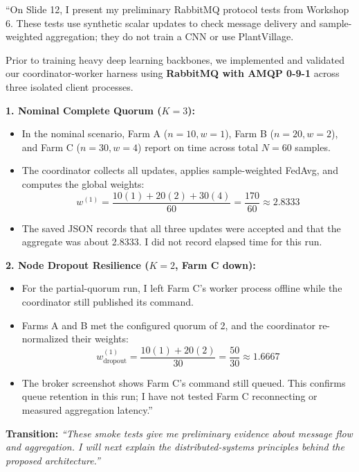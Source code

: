 \documentclass[11pt,a4paper]{article}
\begin{document}
\begin{tcolorbox}[colframe=darkgreen, title=\textbf{What to Say in the Presentation (Literal Script)}]
``On Slide 12, I present my preliminary RabbitMQ protocol tests from Workshop 6. These tests use synthetic scalar updates to check message delivery and sample-weighted aggregation; they do not train a CNN or use PlantVillage.

Prior to training heavy deep learning backbones, we implemented and validated our coordinator-worker harness using \textbf{RabbitMQ with AMQP 0-9-1} across three isolated client processes.

\textbf{1. Nominal Complete Quorum ($K=3$):}
\begin{itemize}
    \item In the nominal scenario, Farm A ($n=10, w=1$), Farm B ($n=20, w=2$), and Farm C ($n=30, w=4$) report on time across total $N=60$ samples.
    \item The coordinator collects all updates, applies sample-weighted FedAvg, and computes the global weights:
    \[ w^{(1)} = \frac{10(1) + 20(2) + 30(4)}{60} = \frac{170}{60} \approx \mathbf{2.8333} \]
    \item The saved JSON records that all three updates were accepted and that the aggregate was about 2.8333. I did not record elapsed time for this run.
\end{itemize}

\textbf{2. Node Dropout Resilience ($K=2$, Farm C down):}
\begin{itemize}
    \item For the partial-quorum run, I left Farm C's worker process offline while the coordinator still published its command.
    \item Farms A and B met the configured quorum of 2, and the coordinator re-normalized their weights:
    \[ w^{(1)}_{\text{dropout}} = \frac{10(1) + 20(2)}{30} = \frac{50}{30} \approx \mathbf{1.6667} \]
    \item The broker screenshot shows Farm C's command still queued. This confirms queue retention in this run; I have not tested Farm C reconnecting or measured aggregation latency.''
\end{itemize}
\end{tcolorbox}

\textbf{Transition:} \textit{``These smoke tests give me preliminary evidence about message flow and aggregation. I will next explain the distributed-systems principles behind the proposed architecture.''}
\end{document}
